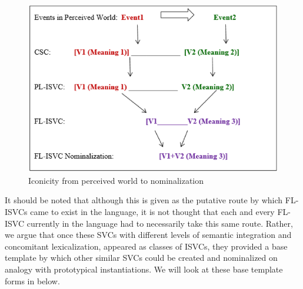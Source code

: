 \documentclass[output=paper,modfonts,nonflat,
colorlinks, citecolor=brown,
]{langsci/langscibook}
\begin{document}
\begin{figure}
\includegraphics[width=\textwidth]{fig-duah-1}
\caption{Iconicity from perceived world to nominalization \citep[41]{kambon2012}}
\label{fig:duah:2}
\end{figure}

It should be noted that although this is given as the putative route by which FL-ISVCs came to exist in the language, it is not thought that each and every FL-ISVC currently in the language had to necessarily take this same route. Rather, we argue that once these SVCs with different levels of semantic integration and concomitant lexicalization, appeared as classes of ISVCs, they provided a base template by which other similar SVCs could be created and nominalized on analogy with prototypical instantiations. We will look at these base template forms in  below.
\end{document}
